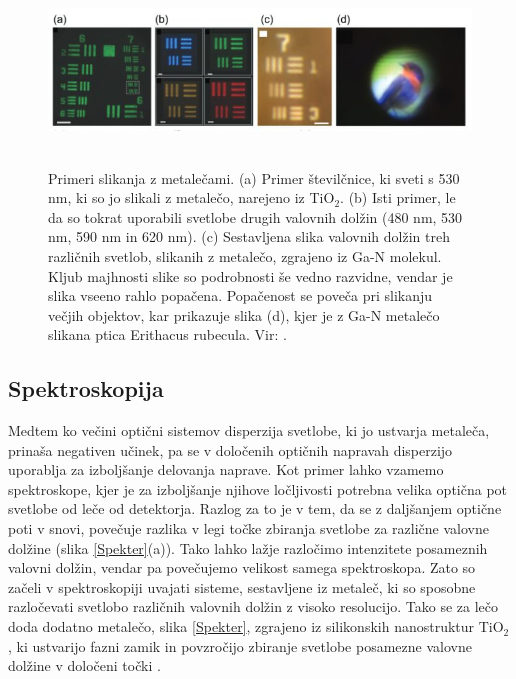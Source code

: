\documentclass[12pt ]{article}
\begin{document}
  \begin{figure}[H]
     \centering
     \includegraphics[width=14cm, height=5cm]{Slike/Ptica.JPG}
     \caption{Primeri slikanja z metalečami. (a) Primer številčnice, ki sveti s 530 nm, ki so jo slikali z metalečo, narejeno iz TiO$_2$. (b) Isti primer, le da so tokrat uporabili svetlobe drugih valovnih dolžin (480 nm, 530 nm, 590 nm in 620 nm). (c) Sestavljena slika valovnih dolžin treh različnih svetlob, slikanih z metalečo, zgrajeno iz Ga-N molekul. Kljub majhnosti slike so podrobnosti še vedno razvidne, vendar je slika vseeno rahlo popačena. Popačenost se poveča pri slikanju večjih objektov, kar prikazuje slika (d), kjer je z Ga-N metalečo slikana ptica Erithacus rubecula. Vir: \cite{Metaleče_opis}. }
     \label{Ptica}
 \end{figure}
 
 \subsection{Spektroskopija}
 Medtem ko večini optični sistemov disperzija svetlobe, ki jo ustvarja metaleča, prinaša negativen učinek, pa se v določenih optičnih napravah disperzijo uporablja za izboljšanje delovanja naprave. Kot primer lahko vzamemo spektroskope, kjer je za izboljšanje njihove ločljivosti potrebna velika optična pot svetlobe od leče od detektorja. Razlog za to je v tem, da se z daljšanjem optične poti v snovi, povečuje razlika v legi točke zbiranja svetlobe za različne valovne dolžine (slika \ref{Spekter}(a)). Tako lahko lažje razločimo intenzitete posameznih valovni dolžin, vendar pa povečujemo velikost samega spektroskopa. Zato so začeli v spektroskopiji uvajati sisteme, sestavljene iz metaleč, ki so sposobne razločevati svetlobo različnih valovnih dolžin z visoko resolucijo. Tako se za lečo doda dodatno metalečo, slika \ref{Spekter}, zgrajeno iz silikonskih nanostruktur TiO$_2$, ki ustvarijo fazni zamik in povzročijo zbiranje svetlobe posamezne valovne dolžine v določeni točki \cite{Metaleče_opis}.
 
\end{document}
